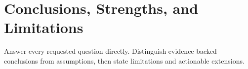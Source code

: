 \section{Conclusions, Strengths, and Limitations}

Answer every requested question directly. Distinguish evidence-backed
conclusions from assumptions, then state limitations and actionable extensions.
